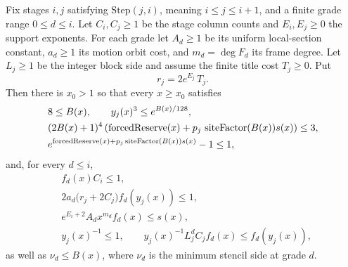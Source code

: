 \begin{lemma}
\label{lem:ex-geyser-radial}
Fix stages $i,j$ satisfying $\mathrm{Step}(j,i)$, meaning $i\leq j\leq i+1$, and a finite grade range $0\leq d\leq i$. Let $C_i,C_j\geq1$ be the stage column counts and $E_i,E_j\geq0$ the support exponents. For each grade let $A_d\geq1$ be its uniform local-section constant, $a_d\geq1$ its motion orbit cost, and $m_d=\deg F_d$ its frame degree. Let $L_j\geq1$ be the integer block side and assume the finite title cost $T_j\geq0$. Put
\[
 r_j=2e^{E_j}\,T_j.
\]
Then there is $x_0>1$ so that every $x\geq x_0$ satisfies
\begin{align}
 &8\leq B(x),\qquad y_j(x)^3\leq e^{B(x)/128},\label{eq:ex-geyser-first}\\
 & (2B(x)+1)^4\left(\operatorname{forcedReserve}(x)+p_j\,\operatorname{siteFactor}(B(x))s(x)\right)\leq3,\notag\\
 &e^{\operatorname{forcedReserve}(x)+p_j\operatorname{siteFactor}(B(x))s(x)}-1\leq1,\label{eq:ex-geyser-second}
\end{align}
and, for every $d\leq i$,
\begin{align}
 &f_d(x)C_i\leq1,\label{eq:ex-geyser-creek1}\\
 &2a_d\bigl(r_j+2C_j\bigr)f_d(y_j(x))\leq1,\label{eq:ex-geyser-creek2}\\
 &e^{E_i+2}A_d x^{m_d}f_d(x)\leq s(x),\label{eq:ex-geyser-creek3}\\
 &y_j(x)^{-1}\leq1,\qquad
 y_j(x)^{-1}L_j^d C_j f_d(x)\leq f_d(y_j(x)),\label{eq:ex-geyser-creek4}
\end{align}
as well as $\nu_d\leq B(x)$, where $\nu_d$ is the minimum stencil side at grade $d$.
\end{lemma}

